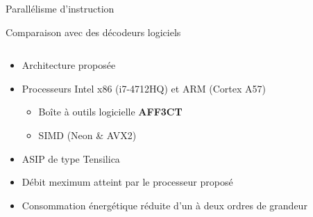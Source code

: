 \documentclass[t,compress,mathserif,12pt,xcolor=dvipsnames]{beamer}
\begin{document}
\begin{frame}[c]{Parallélisme d'instruction}
\end{frame}





\begin{frame}[c]{Comparaison avec des décodeurs logiciels}
	\begin{columns}[T] %
	\begin{column}{.48\textwidth}
		\begin{itemize}
			\item<+-> Architecture proposée
			\item<+-> Processeurs Intel x86 (i7-4712HQ) et ARM (Cortex A57)
			\begin{itemize}
				\item<+-> Boîte à outils logicielle \textbf{AFF3CT}
				\item<+-> SIMD (Neon \& AVX2)
			\end{itemize}
			\item<+-> ASIP de type Tensilica
			\item<+-> Débit meximum atteint par le processeur proposé
			\item<+-> Consommation énergétique réduite d'un à deux ordres de grandeur
		\end{itemize}
	\end{column}

	\begin{column}{.48\textwidth}
\end{column}
\end{columns}
\end{frame}
\end{document}
